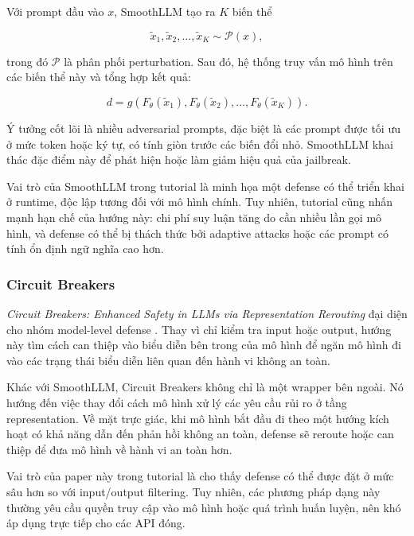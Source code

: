 Với prompt đầu vào $x$, SmoothLLM tạo ra $K$ biến thể

\begin{equation}
    \tilde{x}_1, \tilde{x}_2, \ldots, \tilde{x}_K
    \sim
    \mathcal{P}(x),
    \label{eq:chapter7-smoothllm-perturbation}
\end{equation}

trong đó $\mathcal{P}$ là phân phối perturbation. Sau đó, hệ thống truy vấn
mô hình trên các biến thể này và tổng hợp kết quả:

\begin{equation}
    d
    =
    g
    \left(
        F_{\theta}(\tilde{x}_1),
        F_{\theta}(\tilde{x}_2),
        \ldots,
        F_{\theta}(\tilde{x}_K)
    \right).
    \label{eq:chapter7-smoothllm-aggregation}
\end{equation}

Ý tưởng cốt lõi là nhiều adversarial prompts, đặc biệt là các prompt được
tối ưu ở mức token hoặc ký tự, có tính giòn trước các biến đổi nhỏ.
SmoothLLM khai thác đặc điểm này để phát hiện hoặc làm giảm hiệu quả của
jailbreak.

Vai trò của SmoothLLM trong tutorial là minh họa một defense có thể triển
khai ở runtime, độc lập tương đối với mô hình chính. Tuy nhiên, tutorial
cũng nhấn mạnh hạn chế của hướng này: chi phí suy luận tăng do cần nhiều
lần gọi mô hình, và defense có thể bị thách thức bởi adaptive attacks hoặc
các prompt có tính ổn định ngữ nghĩa cao hơn.

\subsubsection{Circuit Breakers}

\textit{Circuit Breakers: Enhanced Safety in LLMs via Representation
Rerouting} đại diện cho nhóm model-level defense \cite{zou2024circuit}.
Thay vì chỉ kiểm tra input hoặc output, hướng này tìm cách can thiệp vào
biểu diễn bên trong của mô hình để ngăn mô hình đi vào các trạng thái biểu
diễn liên quan đến hành vi không an toàn.

Khác với SmoothLLM, Circuit Breakers không chỉ là một wrapper bên ngoài.
Nó hướng đến việc thay đổi cách mô hình xử lý các yêu cầu rủi ro ở tầng
representation. Về mặt trực giác, khi mô hình bắt đầu đi theo một hướng
kích hoạt có khả năng dẫn đến phản hồi không an toàn, defense sẽ reroute
hoặc can thiệp để đưa mô hình về hành vi an toàn hơn.

Vai trò của paper này trong tutorial là cho thấy defense có thể được đặt ở
mức sâu hơn so với input/output filtering. Tuy nhiên, các phương pháp dạng
này thường yêu cầu quyền truy cập vào mô hình hoặc quá trình huấn luyện,
nên khó áp dụng trực tiếp cho các API đóng.

